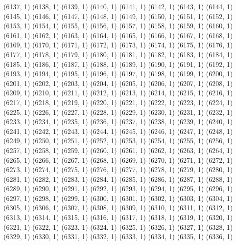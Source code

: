 {   (6137, 1)
   (6138, 1)
   (6139, 1)
   (6140, 1)
   (6141, 1)
   (6142, 1)
   (6143, 1)
   (6144, 1)
   (6145, 1)
   (6146, 1)
   (6147, 1)
   (6148, 1)
   (6149, 1)
   (6150, 1)
   (6151, 1)
   (6152, 1)
   (6153, 1)
   (6154, 1)
   (6155, 1)
   (6156, 1)
   (6157, 1)
   (6158, 1)
   (6159, 1)
   (6160, 1)
   (6161, 1)
   (6162, 1)
   (6163, 1)
   (6164, 1)
   (6165, 1)
   (6166, 1)
   (6167, 1)
   (6168, 1)
   (6169, 1)
   (6170, 1)
   (6171, 1)
   (6172, 1)
   (6173, 1)
   (6174, 1)
   (6175, 1)
   (6176, 1)
   (6177, 1)
   (6178, 1)
   (6179, 1)
   (6180, 1)
   (6181, 1)
   (6182, 1)
   (6183, 1)
   (6184, 1)
   (6185, 1)
   (6186, 1)
   (6187, 1)
   (6188, 1)
   (6189, 1)
   (6190, 1)
   (6191, 1)
   (6192, 1)
   (6193, 1)
   (6194, 1)
   (6195, 1)
   (6196, 1)
   (6197, 1)
   (6198, 1)
   (6199, 1)
   (6200, 1)
   (6201, 1)
   (6202, 1)
   (6203, 1)
   (6204, 1)
   (6205, 1)
   (6206, 1)
   (6207, 1)
   (6208, 1)
   (6209, 1)
   (6210, 1)
   (6211, 1)
   (6212, 1)
   (6213, 1)
   (6214, 1)
   (6215, 1)
   (6216, 1)
   (6217, 1)
   (6218, 1)
   (6219, 1)
   (6220, 1)
   (6221, 1)
   (6222, 1)
   (6223, 1)
   (6224, 1)
   (6225, 1)
   (6226, 1)
   (6227, 1)
   (6228, 1)
   (6229, 1)
   (6230, 1)
   (6231, 1)
   (6232, 1)
   (6233, 1)
   (6234, 1)
   (6235, 1)
   (6236, 1)
   (6237, 1)
   (6238, 1)
   (6239, 1)
   (6240, 1)
   (6241, 1)
   (6242, 1)
   (6243, 1)
   (6244, 1)
   (6245, 1)
   (6246, 1)
   (6247, 1)
   (6248, 1)
   (6249, 1)
   (6250, 1)
   (6251, 1)
   (6252, 1)
   (6253, 1)
   (6254, 1)
   (6255, 1)
   (6256, 1)
   (6257, 1)
   (6258, 1)
   (6259, 1)
   (6260, 1)
   (6261, 1)
   (6262, 1)
   (6263, 1)
   (6264, 1)
   (6265, 1)
   (6266, 1)
   (6267, 1)
   (6268, 1)
   (6269, 1)
   (6270, 1)
   (6271, 1)
   (6272, 1)
   (6273, 1)
   (6274, 1)
   (6275, 1)
   (6276, 1)
   (6277, 1)
   (6278, 1)
   (6279, 1)
   (6280, 1)
   (6281, 1)
   (6282, 1)
   (6283, 1)
   (6284, 1)
   (6285, 1)
   (6286, 1)
   (6287, 1)
   (6288, 1)
   (6289, 1)
   (6290, 1)
   (6291, 1)
   (6292, 1)
   (6293, 1)
   (6294, 1)
   (6295, 1)
   (6296, 1)
   (6297, 1)
   (6298, 1)
   (6299, 1)
   (6300, 1)
   (6301, 1)
   (6302, 1)
   (6303, 1)
   (6304, 1)
   (6305, 1)
   (6306, 1)
   (6307, 1)
   (6308, 1)
   (6309, 1)
   (6310, 1)
   (6311, 1)
   (6312, 1)
   (6313, 1)
   (6314, 1)
   (6315, 1)
   (6316, 1)
   (6317, 1)
   (6318, 1)
   (6319, 1)
   (6320, 1)
   (6321, 1)
   (6322, 1)
   (6323, 1)
   (6324, 1)
   (6325, 1)
   (6326, 1)
   (6327, 1)
   (6328, 1)
   (6329, 1)
   (6330, 1)
   (6331, 1)
   (6332, 1)
   (6333, 1)
   (6334, 1)
   (6335, 1)
   (6336, 1)
}
